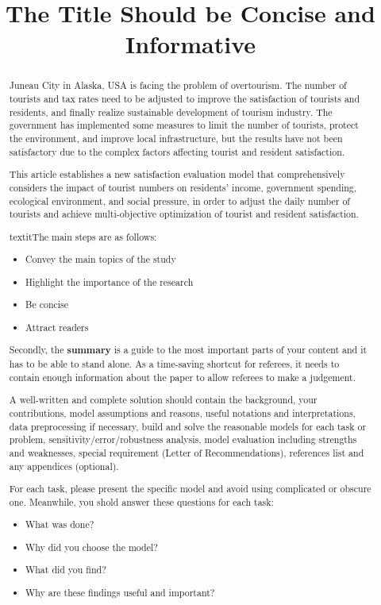 \documentclass[12pt]{article}  %
\title{The Title Should be Concise and Informative}  %
\begin{document}
 
 \begin{abstract}
     
 
 
Juneau City in Alaska, USA is facing the problem of overtourism. The number of tourists and tax rates need to be adjusted to improve the satisfaction of tourists and residents, and finally realize sustainable development of tourism industry. The government has implemented some measures to limit the number of tourists, protect the environment, and improve local infrastructure, but the results have not been satisfactory due to the complex factors affecting tourist and resident satisfaction.
     
This article establishes a new satisfaction evaluation model that comprehensively considers the impact of tourist numbers on residents' income, government spending, ecological environment, and social pressure, in order to adjust the daily number of tourists and achieve multi-objective optimization of tourist and resident satisfaction.

textit{The main steps are as follows:}
 \begin{itemize}
     \setlength{\parsep}{0ex} %
     \setlength{\topsep}{2ex} %
     \setlength{\itemsep}{1ex} %
     \item Convey the main topics of the study
     \item Highlight the importance of the research
     \item Be concise
     \item Attract readers
 \end{itemize}
 
 Secondly, the \textbf{summary} is a guide to the most important parts of your content and it has to be able to stand alone. As a time-saving shortcut for referees, it needs to contain enough information about the paper to allow referees to make a judgement. 
   
 A well-written and complete solution should contain the background, your contributions, model assumptions and reasons, useful notations and interpretations, data preprocessing if necessary, build and solve the reasonable models for each task or problem, sensitivity/error/robustness analysis, model evaluation including strengths and weaknesses, special requirement (Letter of Recommendations), references list and any appendices (optional). 
 
 For each task, please present the specific model and avoid using complicated or obscure one. Meanwhile, you shold answer these questions for each task:
 \begin{itemize}
     \setlength{\parsep}{0ex} %
     \setlength{\topsep}{2ex} %
     \setlength{\itemsep}{1ex} %
     \item What was done?
     \item Why did you choose the model?
     \item What did you find?
     \item Why are these findings useful and important?
 \end{itemize}
 

\end{abstract}
\end{document}
